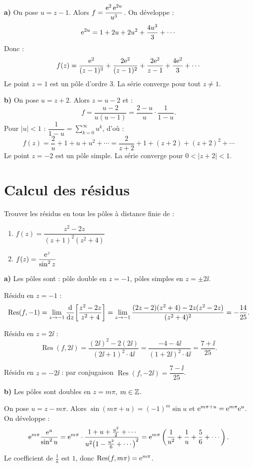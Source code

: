 \documentclass[12pt,a4paper]{article}
\begin{document}
\begin{boitecorrige}
\textbf{a)} On pose $u = z-1$. Alors $f = \dfrac{\mathrm{e}^2\,\mathrm{e}^{2u}}{u^3}$. On développe :
\[
\mathrm{e}^{2u} = 1 + 2u + 2u^2 + \frac{4u^3}{3} + \cdots
\]
Donc :
\[
f(z) = \frac{\mathrm{e}^2}{(z-1)^3} + \frac{2\mathrm{e}^2}{(z-1)^2} + \frac{2\mathrm{e}^2}{z-1} + \frac{4\mathrm{e}^2}{3} + \cdots
\]
Le point $z=1$ est un pôle d'ordre $3$. La série converge pour tout $z \neq 1$.

\textbf{b)} On pose $u = z+2$. Alors $z = u-2$ et :
\[
f = \frac{u-2}{u(u-1)} = \frac{2-u}{u}\cdot\frac{1}{1-u}.
\]
Pour $|u|<1$ : $\dfrac{1}{1-u} = \sum_{k=0}^{\infty} u^k$, d'où :
\[
f(z) = \frac{2}{u} + 1 + u + u^2 + \cdots = \frac{2}{z+2} + 1 + (z+2) + (z+2)^2 + \cdots
\]
Le point $z=-2$ est un pôle simple. La série converge pour $0 < |z+2| < 1$.
\end{boitecorrige}

\section{Calcul des résidus}

\begin{boiteexercice}
\niveau{\difficile}
Trouver les résidus en tous les pôles à distance finie de :
\begin{enumerate}[label=\alph*)]
  \item $f(z) = \dfrac{z^2-2z}{(z+1)^2(z^2+4)}$
  \item $f(z) = \dfrac{\mathrm{e}^z}{\sin^2 z}$
\end{enumerate}
\end{boiteexercice}

\begin{boitecorrige}

\textbf{a)} Les pôles sont : pôle double en $z=-1$, pôles simples en $z=\pm 2\ii$.

Résidu en $z=-1$ :
\[
\operatorname{Res}(f,-1) = \lim_{z\to -1}\frac{\mathrm{d}}{\mathrm{d} z}\!\left[\frac{z^2-2z}{z^2+4}\right]
= \lim_{z\to -1}\frac{(2z-2)(z^2+4)-2z(z^2-2z)}{(z^2+4)^2} = -\frac{14}{25}.
\]

Résidu en $z=2\ii$ :
\[
\operatorname{Res}(f,2\ii) = \frac{(2\ii)^2-2(2\ii)}{(2\ii+1)^2\cdot 4\ii} = \frac{-4-4\ii}{(1+2\ii)^2\cdot 4\ii} = \frac{7+\ii}{25}.
\]

Résidu en $z=-2\ii$ : par conjugaison $\operatorname{Res}(f,-2\ii) = \dfrac{7-\ii}{25}$.

\textbf{b)} Les pôles sont doubles en $z=m\pi$, $m\in\mathbb{Z}$.

On pose $u = z - m\pi$. Alors $\sin(m\pi + u) = (-1)^m\sin u$ et $\mathrm{e}^{m\pi+u} = \mathrm{e}^{m\pi}\mathrm{e}^u$. On développe :
\[
\mathrm{e}^{m\pi}\frac{\mathrm{e}^u}{\sin^2 u}
= \mathrm{e}^{m\pi}\cdot\frac{1+u+\frac{u^2}{2}+\cdots}{u^2\!\left(1-\frac{u^2}{6}+\cdots\right)^2}
= \mathrm{e}^{m\pi}\left(\frac{1}{u^2}+\frac{1}{u}+\frac{5}{6}+\cdots\right).
\]
Le coefficient de $\tfrac{1}{u}$ est $1$, donc $\operatorname{Res}(f, m\pi) = \mathrm{e}^{m\pi}$.
\end{boitecorrige}
\end{document}
